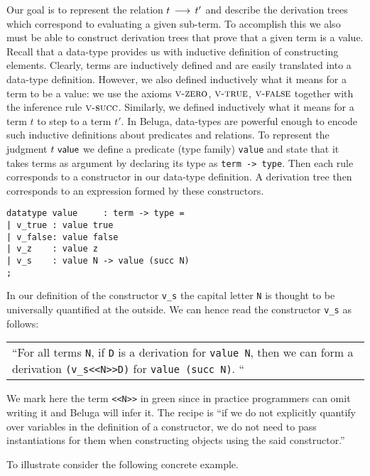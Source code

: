 Our goal is to represent the relation $t \mathrel{\,\longrightarrow\,} t'$ and describe the derivation
trees which correspond to evaluating a given sub-term. To accomplish this we
also must be able to construct derivation trees that prove that a given term is
a value. Recall that a data-type provides us with inductive definition of
constructing elements. Clearly, terms are inductively defined and are easily
translated into a data-type definition. However, we also defined inductively
what it means for a term to be a value: we use the axioms $\textsc{v-zero}$, $\textsc{v-true}$,
$\textsc{v-false}$ together with the inference rule $\textsc{v-succ}$. Similarly, we defined
inductively what it means for a term $t$ to step to a term $t'$. In Beluga,
data-types are powerful enough to encode such inductive definitions about
predicates and relations. To represent the judgment $t ~\textsf{value}$ we define a
predicate (type family) \lstinline!value! and state that it takes terms as
argument by declaring its type as \lstinline!term -> type!. Then each rule
corresponds to a constructor in our data-type definition. A derivation tree then
corresponds to an expression formed by these constructors.

\begin{lstlisting}
datatype value     : term -> type = 
| v_true : value true
| v_false: value false
| v_z    : value z
| v_s    : value N -> value (succ N)
;
\end{lstlisting}

In our definition of the constructor \lstinline!v_s! the capital letter
\lstinline!N! is thought to be universally quantified at the outside. We can
hence read the constructor \lstinline!v_s! as follows: 

\begin{center}
\begin{tabular}{p{12cm}}
``For all terms
\lstinline$N$, if \lstinline!D! is a derivation for \lstinline!value N!, then we can form a derivation
\lstinline!(v_s<<N>>D)! for \lstinline!value (succ N)!. ``  
\end{tabular}  
\end{center}


We mark here the term \lstinline!<<N>>! in green since in practice programmers
can omit writing it and Beluga will infer it. The recipe is ``if we do not
explicitly quantify over variables in the definition of a constructor, we do not
need to pass instantiations for them when constructing objects using the said constructor.''

To illustrate consider the following concrete example.\\[1em]

